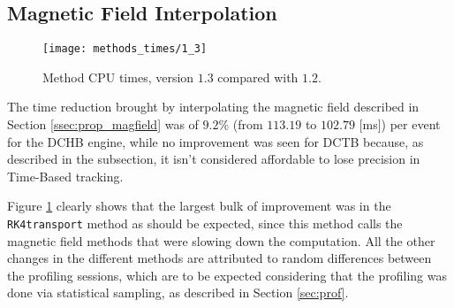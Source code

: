 \subsection{Magnetic Field Interpolation} \label{ssec:val_magfield}

    \begin{figure}[ht]
        \centering
        \texttt{[image: methods\_times/1\_3]}
        \caption{\label{fig:methods_times-1_3} Method CPU times, version $1.3$ compared with $1.2$.}
    \end{figure}
    
The time reduction brought by interpolating the magnetic field described in Section \ref{ssec:prop_magfield} was of $9.2\%$ (from $113.19$ to $102.79$ [ms]) per event for the DCHB engine, while no improvement was seen for DCTB because, as described in the subsection, it isn't considered affordable to lose precision in Time-Based tracking.

Figure \ref{fig:methods_times-1_3} clearly shows that the largest bulk of improvement was in the \texttt{RK4transport} method as should be expected, since this method calls the magnetic field methods that were slowing down the computation.
All the other changes in the different methods are attributed to random differences between the profiling sessions, which are to be expected considering that the profiling was done via statistical sampling, as described in Section \ref{sec:prof}.